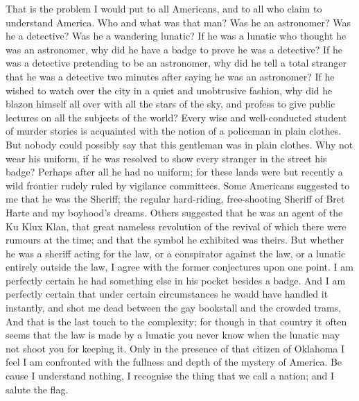 \documentclass{book}
\begin{document}
That is the problem I would put to all Americans, and to all who claim to understand America. Who and what was that man? Was he an astronomer? Was he a detective? Was he a wandering lunatic? If he was a lunatic who thought he was an astronomer, why did he have a badge to prove he was a detective? If he was a detective pretending to be an astronomer, why did he tell a total stranger that he was a detective two minutes after saying he was an astronomer? If he wished to watch over the city in a quiet and unobtrusive fashion, why did he blazon himself all over with all the stars of the sky, and profess to give public lectures on all the subjects of the world? Every wise and well-conducted student of murder stories is acquainted with the notion of a policeman in plain clothes. But nobody could possibly say that this gentleman was in plain clothes. Why not wear his uniform, if he was resolved to show every stranger in the street his badge? Perhaps after all he had no uniform; for these lands were but recently a wild frontier rudely ruled by vigilance committees. Some Americans suggested to me that he was the Sheriff; the regular hard-riding, free-shooting Sheriff of Bret Harte and my boyhood’s dreams. Others suggested that he was an agent of the Ku Klux Klan, that great nameless revolution of the revival of which there were rumours at the time; and that the symbol he exhibited was theirs. But whether he was a sheriff acting for the law, or a conspirator against the law, or a lunatic entirely outside the law, I agree with the former conjectures upon one point. I am perfectly certain he had something else in his pocket besides a badge. And I am perfectly certain that under certain circumstances he would have handled it instantly, and shot me dead between the gay bookstall and the crowded trams, And that is the last touch to the complexity; for though in that country it often seems that the law is made by a lunatic you never know when the lunatic may not shoot you for keeping it. Only in the presence of that citizen of Oklahoma I feel I am confronted with the fullness and depth of the mystery of America. Be cause I understand nothing, I recognise the thing that we call a nation; and I salute the flag.
\end{document}
